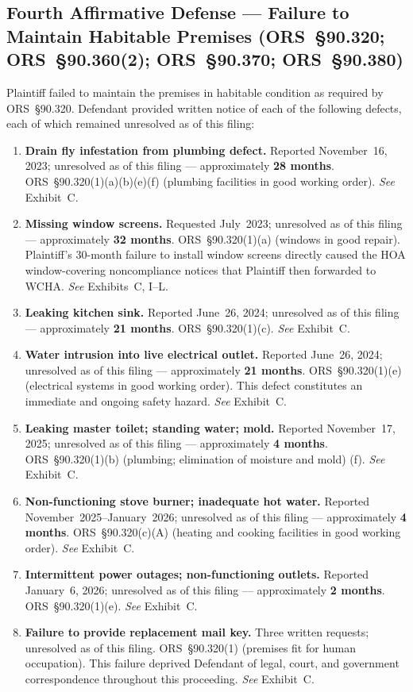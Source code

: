 \documentclass[10pt,letterpaper,oneside]{extarticle}
\begin{document}
\subsection{\textbf{Fourth Affirmative Defense ---
		Failure to Maintain Habitable Premises
		(ORS~\S90.320; ORS~\S90.360(2); ORS~\S90.370;
		ORS~\S90.380)}}
Plaintiff failed to maintain the premises in habitable
condition as required by ORS~\S90.320. Defendant provided
written notice of each of the following defects, each of
which remained unresolved as of this filing:
\begin{enumerate}[label=(\alph*),leftmargin=.5in,
	itemsep=4pt]
	\item \textbf{Drain fly infestation from plumbing
		defect.} Reported November~16, 2023; unresolved as of
	this filing --- approximately \textbf{28 months}.
	ORS~\S90.320(1)(a)(b)(e)(f) (plumbing facilities in good working
	order). \textit{See} Exhibit~C.
	\item \textbf{Missing window screens.} Requested
	July~2023; unresolved as of this filing ---
	approximately \textbf{32 months}.
	ORS~\S90.320(1)(a) (windows in good repair).
	Plaintiff's 30-month failure to install window screens
	directly caused the HOA window-covering noncompliance
	notices that Plaintiff then forwarded to WCHA.
	\textit{See} Exhibits~C, I--L.
	\item \textbf{Leaking kitchen sink.} Reported
	June~26, 2024; unresolved as of this filing ---
	approximately \textbf{21 months}.
	ORS~\S90.320(1)(c). \textit{See} Exhibit~C.
	\item \textbf{Water intrusion into live electrical
		outlet.} Reported June~26, 2024; unresolved as of this
	filing --- approximately \textbf{21 months}.
	ORS~\S90.320(1)(e) (electrical systems in good working
	order). This defect constitutes an immediate and
	ongoing safety hazard. \textit{See} Exhibit~C.
	\item \textbf{Leaking master toilet; standing water;
		mold.} Reported November~17, 2025; unresolved as of
	this filing --- approximately \textbf{4 months}.
	ORS~\S90.320(1)(b) (plumbing; elimination of
	moisture and mold) (f). \textit{See} Exhibit~C.
	\item \textbf{Non-functioning stove burner; inadequate
		hot water.} Reported November~2025--January~2026;
	unresolved as of this filing --- approximately
	\textbf{4 months}. ORS~\S90.320(c)(A) (heating and
	cooking facilities in good working order).
	\textit{See} Exhibit~C.
	\item \textbf{Intermittent power outages;
		non-functioning outlets.} Reported January~6, 2026;
	unresolved as of this filing --- approximately
	\textbf{2 months}. ORS~\S90.320(1)(e).
	\textit{See} Exhibit~C.
	\item \textbf{Failure to provide replacement mail key.}
	Three written requests; unresolved as of this filing.
	ORS~\S90.320(1) (premises fit for human occupation).
	This failure deprived Defendant of legal, court, and
	government correspondence throughout this proceeding.
	\textit{See} Exhibit~C.
\end{enumerate}
\end{document}
